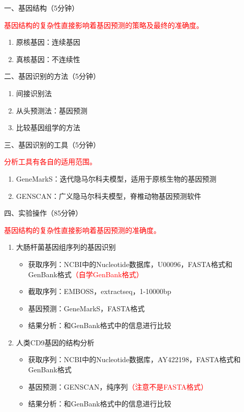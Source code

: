 \documentclass{TIJMUjiaoanSY}
\begin{document}

\firstTail


\newpage
\otherHeader

\noindent
一、基因结构（5分钟）

\textcolor{red}{基因结构的复杂性直接影响着基因预测的策略及最终的准确度。}
\begin{enumerate}
  \item 原核基因：连续基因
  \item 真核基因：不连续性
\end{enumerate}

\noindent
二、基因识别的方法（5分钟）
\begin{enumerate}
  \item 间接识别法
  \item 从头预测法：基因预测
  \item 比较基因组学的方法
\end{enumerate}

\noindent
三、基因识别的工具（5分钟）

\textcolor{red}{分析工具有各自的适用范围。}
\begin{enumerate}
  \item GeneMarkS：迭代隐马尔科夫模型，适用于原核生物的基因预测
  \item GENSCAN：广义隐马尔科夫模型，脊椎动物基因预测软件
\end{enumerate}

\noindent
四、实验操作（85分钟）

\textcolor{red}{基因结构的复杂性直接影响着基因预测的准确度。}
\begin{enumerate}
  \item 大肠杆菌基因组序列的基因识别
    \begin{itemize}
      \item 获取序列：NCBI中的Nucleotide数据库，U00096，FASTA格式和GenBank格式\textcolor{red}{（自学GenBank格式）}
      \item 截取序列：EMBOSS，extractseq，1-10000bp
      \item 基因预测：GeneMarkS，FASTA格式
      \item 结果分析：和GenBank格式中的信息进行比较
    \end{itemize}
  \item 人类CD9基因的结构分析
    \begin{itemize}
      \item 获取序列：NCBI中的Nucleotide数据库，AY422198，FASTA格式和GenBank格式
      \item 基因预测：GENSCAN，纯序列\textcolor{red}{（注意不是FASTA格式）}
      \item 结果分析：和GenBank格式中的信息进行比较
    \end{itemize}
\end{enumerate}

\otherTail
\end{document}
